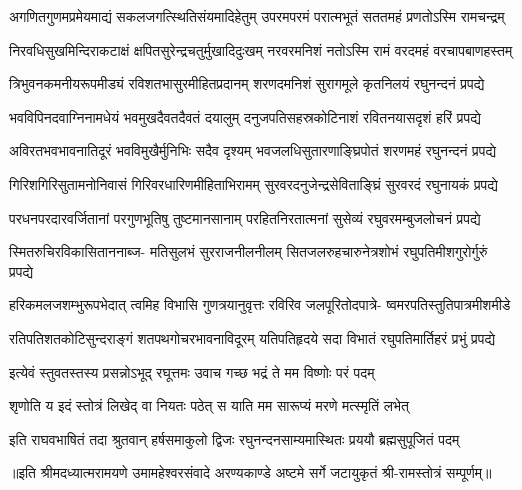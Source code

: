 


\addtocounter{shlokacount}{43}

\fourlineindentedshloka
{अगणितगुणमप्रमेयमाद्यं}
{सकलजगत्स्थितिसंयमादिहेतुम्}
{उपरमपरमं परात्मभूतं}
{सततमहं प्रणतोऽस्मि रामचन्द्रम्} %

\fourlineindentedshloka
{निरवधिसुखमिन्दिराकटाक्षं}
{क्षपितसुरेन्द्रचतुर्मुखादिदुःखम्}
{नरवरमनिशं नतोऽस्मि रामं}
{वरदमहं वरचापबाणहस्तम्} %

\fourlineindentedshloka
{त्रिभुवनकमनीयरूपमीड्यं}
{रविशतभासुरमीहितप्रदानम्}
{शरणदमनिशं सुरागमूले}
{कृतनिलयं रघुनन्दनं प्रपद्ये} %

\fourlineindentedshloka
{भवविपिनदवाग्निनामधेयं}
{भवमुखदैवतदैवतं दयालुम्}
{दनुजपतिसहस्रकोटिनाशं}
{रवितनयासदृशं हरिं प्रपद्ये} %

\fourlineindentedshloka
{अविरतभवभावनातिदूरं}
{भवविमुखैर्मुनिभिः सदैव दृश्यम्}
{भवजलधिसुतारणाङ्घ्रिपोतं}
{शरणमहं रघुनन्दनं प्रपद्ये} %

\fourlineindentedshloka
{गिरिशगिरिसुतामनोनिवासं}
{गिरिवरधारिणमीहिताभिरामम्}
{सुरवरदनुजेन्द्रसेविताङ्घ्रिं}
{सुरवरदं रघुनायकं प्रपद्ये} %

\fourlineindentedshloka
{परधनपरदारवर्जितानां}
{परगुणभूतिषु तुष्टमानसानाम्}
{परहितनिरतात्मनां सुसेव्यं}
{रघुवरमम्बुजलोचनं प्रपद्ये} %

\fourlineindentedshloka
{स्मितरुचिरविकासिताननाब्ज-}
{मतिसुलभं सुरराजनीलनीलम्}
{सितजलरुहचारुनेत्रशोभं}
{रघुपतिमीशगुरोर्गुरुं प्रपद्ये} %

\fourlineindentedshloka
{हरिकमलजशम्भुरूपभेदात्}
{त्वमिह विभासि गुणत्रयानुवृत्तः}
{रविरिव जलपूरितोदपात्रे-}
{ष्वमरपतिस्तुतिपात्रमीशमीडे} %

\fourlineindentedshloka
{रतिपतिशतकोटिसुन्दराङ्गं}
{शतपथगोचरभावनाविदूरम्}
{यतिपतिहृदये सदा विभातं}
{रघुपतिमार्तिहरं प्रभुं प्रपद्ये} %

\twolineshloka
{इत्येवं स्तुवतस्तस्य प्रसन्नोऽभूद् रघूत्तमः}
{उवाच गच्छ भद्रं ते मम विष्णोः परं पदम्} %

\twolineshloka
{शृणोति य इदं स्तोत्रं लिखेद् वा नियतः पठेत्}
{स याति मम सारूप्यं मरणे मत्स्मृतिं लभेत्} %

\fourlineindentedshloka
{इति राघवभाषितं तदा}
{श्रुतवान् हर्षसमाकुलो द्विजः}
{रघुनन्दनसाम्यमास्थितः}
{प्रययौ ब्रह्मसुपूजितं पदम्} %

{॥इति श्रीमदध्यात्मरामयणे उमामहेश्वरसंवादे
अरण्यकाण्डे अष्टमे  सर्गे  जटायुकृतं  श्री-रामस्तोत्रं  सम्पूर्णम्॥}
